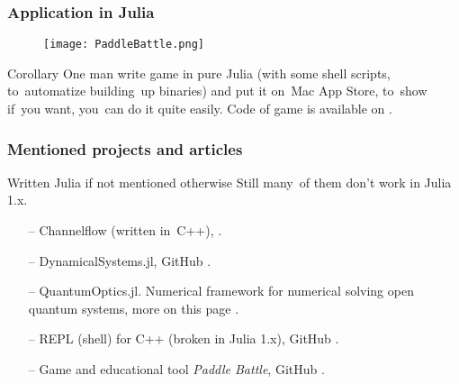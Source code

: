 \documentclass{beamer}  %
\begin{document}
\begin{frame}
  \frametitle{Application in Julia}

  \begin{figure}
    \centering

    \texttt{[image: PaddleBattle.png]}
  \end{figure}

  \begin{block}{Corollary}
    One man write game in pure Julia (with some shell scripts,
    to~automatize building~up binaries) and put it on~Mac App Store,
    to~show if~you want, you~can do it quite easily. Code of game is
    available on
    .
  \end{block}

\end{frame}





\begin{frame}
  \frametitle{Mentioned projects and articles}

  \begin{block}{Written Julia if not mentioned otherwise}
    Still many~of them don't work in Julia 1.x.
    \begin{itemize}
    \item[--] Channelflow (written in~C++),
      .
    \item[--] DynamicalSystems.jl, GitHub
      .
    \item[--] QuantumOptics.jl. Numerical framework for numerical
      solving open quantum systems, more on this page
      .
    \item[--] REPL (shell) for C++ (broken in Julia 1.x), GitHub
      .
    \item[--] Game and educational tool \emph{Paddle Battle}, GitHub
      .
    \end{itemize}
  \end{block}

\end{frame}






 {}



\end{document}
